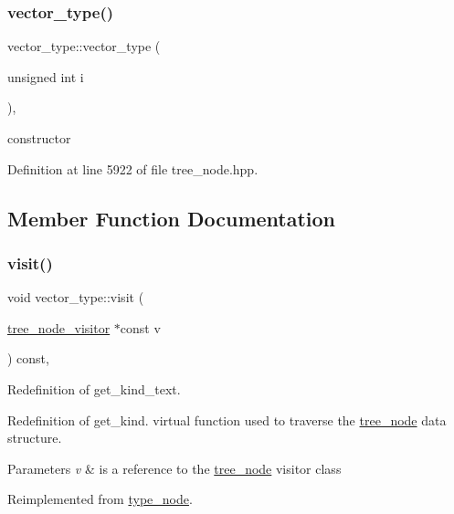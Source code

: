 \subsubsection{\texorpdfstring{vector\+\_\+type()}{vector\_type()}}
{\footnotesize\ttfamily vector\+\_\+type\+::vector\+\_\+type (\begin{DoxyParamCaption}\item[{unsigned int}]{i }\end{DoxyParamCaption})\hspace{0.3cm}{\ttfamily [inline]}, {\ttfamily [explicit]}}



constructor 



Definition at line 5922 of file tree\+\_\+node.\+hpp.



\subsection{Member Function Documentation}
\mbox{\label{structvector__type_a628f2913374a823ed425afdd76197459}} 
\subsubsection{\texorpdfstring{visit()}{visit()}}
{\footnotesize\ttfamily void vector\+\_\+type\+::visit (\begin{DoxyParamCaption}\item[{\hyperlink{classtree__node__visitor}{tree\+\_\+node\+\_\+visitor} $\ast$const}]{v }\end{DoxyParamCaption}) const\hspace{0.3cm}{\ttfamily [override]}, {\ttfamily [virtual]}}



Redefinition of get\+\_\+kind\+\_\+text. 

Redefinition of get\+\_\+kind. virtual function used to traverse the \hyperlink{classtree__node}{tree\+\_\+node} data structure. 
\begin{DoxyParams}{Parameters}
{\em v} & is a reference to the \hyperlink{classtree__node}{tree\+\_\+node} visitor class \\
\hline
\end{DoxyParams}


Reimplemented from \hyperlink{structtype__node_adc6e447af5f9505e6305320933c46a96}{type\+\_\+node}.



